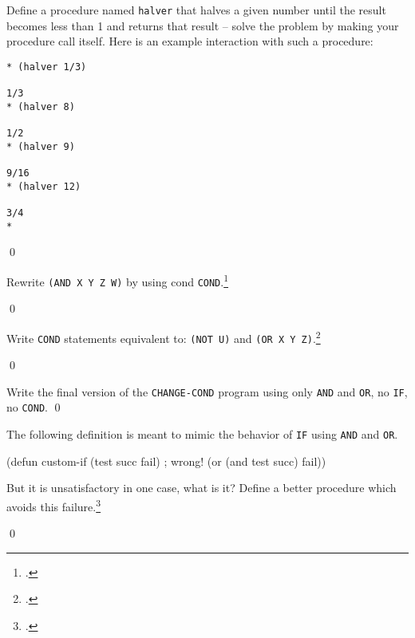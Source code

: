 \documentclass[a4paper,11pt]{article}
\begin{document}
\begin{uexercise}
Define a procedure named \Verb+halver+ that halves a given number until the result becomes less than 1 and returns that result -- solve the problem by making your procedure call itself. Here is an example interaction with such a procedure:

\begin{ucodeframe}
\begin{Verbatim}
* (halver 1/3)

1/3
* (halver 8)

1/2
* (halver 9)

9/16
* (halver 12)

3/4
*
\end{Verbatim}
\end{ucodeframe}

\qed
\end{uexercise}

\begin{uexercise}

Rewrite \Verb+(AND X Y Z W)+ by using cond \Verb+COND+.\footnote{.}

\qed
\end{uexercise}

\begin{uexercise}
Write \Verb+COND+ statements equivalent to: \Verb+(NOT U)+ and \Verb+(OR X Y Z)+.\footnote{.}

\qed
\end{uexercise}

\begin{uexercise}
Write the final version of the \Verb+CHANGE-COND+ program using only \Verb+AND+ and \Verb+OR+, no \Verb+IF+, no \Verb+COND+. 
\qed
\end{uexercise}

\begin{uexercise}
The following definition is meant to mimic the behavior of \Verb+IF+ using \Verb+AND+ and \Verb+OR+.

\begin{lispcode}
(defun custom-if (test succ fail) ; wrong!
  (or (and test succ) fail))
\end{lispcode}

But it is unsatisfactory in one case, what is it? 
Define a better procedure which avoids this failure.\footnote{.}

\qed
\end{uexercise}
\end{document}
